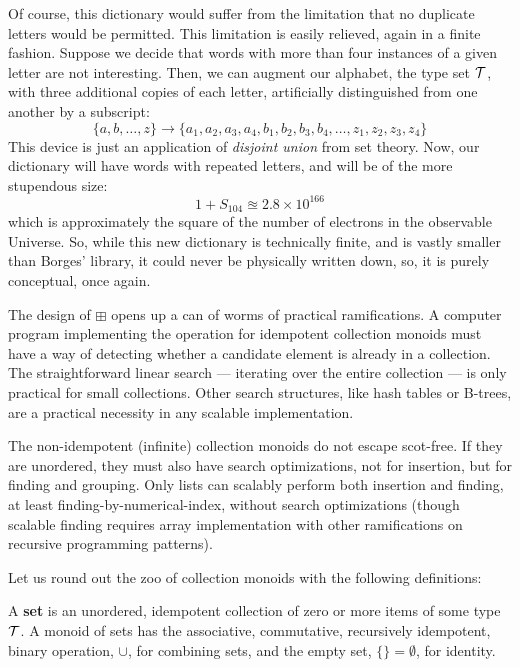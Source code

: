 Of course, this dictionary would suffer from the limitation that no duplicate letters would be permitted. This limitation is easily relieved, again in a finite fashion. Suppose we decide that words with more than four instances of a given letter are not interesting. Then, we can augment our alphabet, the type set $\mathcal{T}$, with three additional copies of each letter, artificially distinguished from one another by a subscript:
\[
 \{a,b,\ldots,z\}\rightarrow\{a_1,a_2,a_3,a_4,
 b_1,b_2,b_3,b_4,
 \ldots,z_1,z_2,z_3,z_4\}
\]
This device is just an application of \emph{disjoint union} from set theory. Now, our dictionary will have words with repeated letters, and will be of the more stupendous size:
\[
  1+S_{104}\approxeq 2.8\times 10^{166}
\]
which is approximately the square of the number of electrons in the observable Universe. So, while this new dictionary is technically finite, and is vastly smaller than Borges' library, it could never be physically written down, so, it is purely conceptual, once again.


The design of $\boxplus$ opens up a can of worms of practical ramifications. A computer program implementing the operation for idempotent collection monoids must have a way of detecting whether a candidate element is already in a collection. The straightforward linear search --- iterating over the entire collection --- is only practical for small collections. Other search structures, like hash tables or B-trees, are a practical necessity in any scalable implementation.


The non-idempotent (infinite) collection monoids do not escape scot-free. If they are unordered, they must also have search optimizations, not for insertion, but for finding and grouping. Only lists can scalably perform both insertion and finding, at least finding-by-numerical-index, without search optimizations (though scalable finding requires array implementation with other ramifications on recursive programming patterns).


Let us round out the zoo of collection monoids with the following definitions:


\begin{definition}
  A \textbf{set} is an unordered, idempotent collection of zero or more items of some type $\mathcal{T}$. A monoid of sets has the associative, commutative, recursively idempotent, binary operation, $\cup$, for combining sets, and the empty set, $\{\}=\emptyset$, for identity.
\end{definition}


